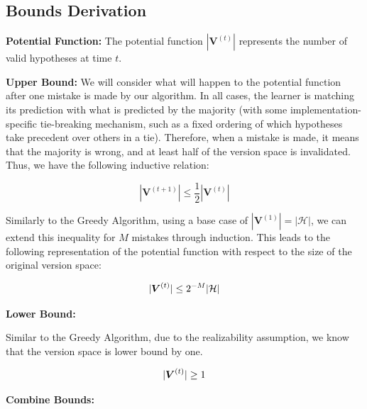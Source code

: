 \documentclass[11pt]{article}
\begin{document}
\subsection{Bounds Derivation}



\textbf{Potential Function:
}    
The potential function $|\boldsymbol{V}^{(t)}|$ represents the number of valid hypotheses at time $t$.

\textbf{Upper Bound:
}
We will consider what will happen to the potential function after one mistake is made by our algorithm. In all cases, the learner is matching its prediction with what is predicted by the majority (with some implementation-specific tie-breaking mechanism, such as a fixed ordering of which hypotheses take precedent over others in a tie). Therefore, when a mistake is made, it means that the majority is wrong, and at least half of the version space is invalidated. Thus, we have the following inductive relation:

$$|\boldsymbol{V}^{(t+1)}| \leq \frac{1}{2} |\boldsymbol{V}^{(t)}| $$

Similarly to the Greedy Algorithm, using a base case of $|\boldsymbol{V}^{(1)}| = |\mathcal{H}|$, we can extend this inequality for $M$ mistakes through induction. This leads to the following representation of the potential function with respect to the size of the original version space:

\begin{equation}
\centering
|\boldsymbol{V}^{(t)}| \leq  2^{-M}|\mathcal{H}|
\label{eq:halving-upper-bound}
\end{equation}

\textbf{Lower Bound:} 

Similar to the Greedy Algorithm, due to the realizability assumption, we know that the version space is lower bound by one.

\begin{equation}
\centering
|\boldsymbol{V}^{(t)}| \ge 1
\label{eq:halving-lower-bound}
\end{equation}

\textbf{Combine Bounds:}
\end{document}
